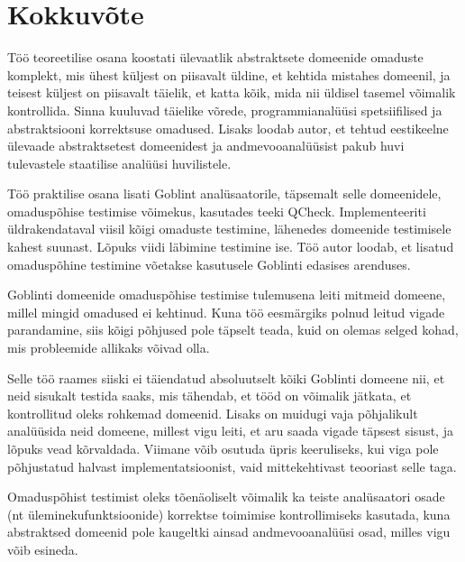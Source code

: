 \documentclass[../thesis.tex]{subfiles}
\begin{document}
\section*{Kokkuvõte}

Töö teoreetilise osana koostati ülevaatlik abstraktsete domeenide omaduste komplekt, mis ühest küljest on piisavalt üldine, et kehtida mistahes domeenil, ja teisest küljest on piisavalt täielik, et katta kõik, mida nii üldisel tasemel võimalik kontrollida. Sinna kuuluvad täielike võrede, programmianalüüsi spetsiifilised ja abstraktsiooni korrektsuse omadused. Lisaks loodab autor, et tehtud eestikeelne ülevaade abstraktsetest domeenidest ja andmevooanalüüsist pakub huvi tulevastele staatilise analüüsi huvilistele.

Töö praktilise osana lisati Goblint analüsaatorile, täpsemalt selle domeenidele, omaduspõhise testimise võimekus, kasutades teeki QCheck. Implementeeriti üldrakendataval viisil kõigi omaduste testimine, lähenedes domeenide testimisele kahest suunast. Lõpuks viidi läbimine testimine ise. Töö autor loodab, et lisatud omaduspõhine testimine võetakse kasutusele Goblinti edasises arenduses.

Goblinti domeenide omaduspõhise testimise tulemusena leiti mitmeid domeene, millel mingid omadused ei kehtinud. Kuna töö eesmärgiks polnud leitud vigade parandamine, siis kõigi põhjused pole täpselt teada, kuid on olemas selged kohad, mis probleemide allikaks võivad olla.

Selle töö raames siiski ei täiendatud absoluutselt kõiki Goblinti domeene nii, et neid sisukalt testida saaks, mis tähendab, et tööd on võimalik jätkata, et kontrollitud oleks rohkemad domeenid. Lisaks on muidugi vaja põhjalikult analüüsida neid domeene, millest vigu leiti, et aru saada vigade täpsest sisust, ja lõpuks vead kõrvaldada. Viimane võib osutuda üpris keeruliseks, kui viga pole põhjustatud halvast implementatsioonist, vaid mittekehtivast teooriast selle taga.

Omaduspõhist testimist oleks tõenäoliselt võimalik ka teiste analüsaatori osade (nt üleminekufunktsioonide) korrektse toimimise kontrollimiseks kasutada, kuna abstraktsed domeenid pole kaugeltki ainsad andmevooanalüüsi osad, milles vigu võib esineda.

\end{document}

